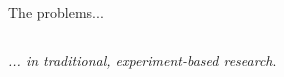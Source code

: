 \begin{frame}{The problems...  %
  }
\begin{columns}
\begin{column}{0.55\textwidth}
      \vspace{-0.72cm}
      \begin{center}
        \textit{... in traditional, experiment-based research}.
      \end{center}
    \end{column}
  \end{columns}

\end{frame}



